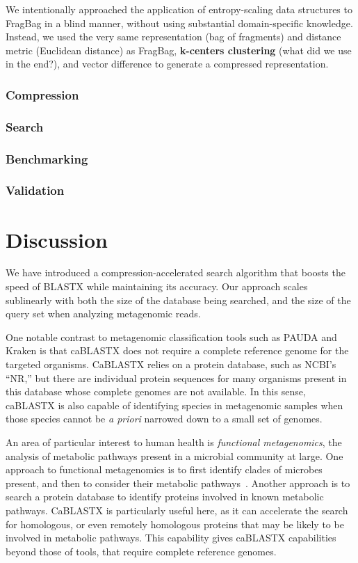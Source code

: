 \documentclass{amsbook}
\theoremstyle{definition}
\theoremstyle{remark}
\numberwithin{equation}{section}
\begin{document}
We intentionally approached the application of entropy-scaling data structures to FragBag in a blind manner,
without using substantial domain-specific knowledge.
Instead, we used the very same representation (bag of fragments) and distance metric (Euclidean distance)
as FragBag, \textbf{k-centers clustering} (what did we use in the end?), and vector difference to generate a
compressed representation.

\subsection*{Compression}

\subsection*{Search}

\subsection*{Benchmarking}

\subsection*{Validation}

\chapter*{Discussion}

We have introduced a compression-accelerated search algorithm that boosts the
speed of BLASTX while maintaining its accuracy.
Our approach scales sublinearly with both the size of the database being
searched, and the size of the query set when analyzing metagenomic reads.

One notable contrast to metagenomic classification tools such as PAUDA and
Kraken is that caBLASTX does not require a complete reference genome for the
targeted organisms.
CaBLASTX relies on a protein database, such as NCBI's ``NR,'' but there are
individual protein sequences for many organisms present in this database whose
complete genomes are not available.
In this sense, caBLASTX is also capable of identifying species in metagenomic
samples when those species cannot be \emph{a priori} narrowed down to a small
set of genomes.

An area of particular interest to human health is \emph{functional 
metagenomics}, the analysis of metabolic pathways present in a microbial
community at large.
One approach to functional metagenomics is to first identify clades of
microbes present, and then to consider their metabolic pathways~\cite{blah}.
Another approach is to search a protein database to identify proteins involved
in known metabolic pathways.
CaBLASTX is particularly useful here, as it can accelerate the search for
homologous, or even remotely homologous proteins that may be likely to be
involved in metabolic pathways.
This capability gives caBLASTX capabilities beyond those of tools, that require
complete reference genomes.
\end{document}
